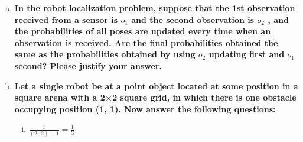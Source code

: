 \documentclass{article}
\begin{document}
\begin{enumerate}
\begin{enumerate}[(a)]
    \item {\bf In the robot localization problem, suppose that the 1st
               observation received from a sensor is $o_1$ and the second
               observation is $o_2$ , and the probabilities of all poses are
               updated every time when an observation is received. Are the final
               probabilities obtained the same as the probabilities obtained by
               using $o_2$ updating first and $o_1$ second? Please justify your
               answer.}

    \item {\bf Let a single robot be at a point object located at some position
               in a square arena with a 2×2 square grid, in which there is one
               obstacle occupying position (1, 1). Now answer the following
               questions:}

      \begin{enumerate}[(i)]
        \item $\frac{1}{(2 \cdot 2) - 1} = \frac{1}{3}$
      \end{enumerate}

  \end{enumerate}


\end{enumerate}
\end{document}
